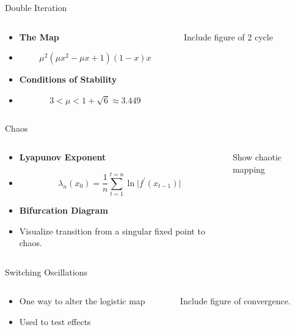 \documentclass{beamer}
\begin{document}
\begin{frame}{Double Iteration}
	\begin{columns}
		\begin{column}{0.5\textwidth}
			\begin{itemize}
				\item
					\textbf{The Map}
				\item
					\begin{equation*}
						\mu^2(\mu x^2-\mu x+1)(1-x)x
					\end{equation*}
				\pause
				\item
					\textbf{Conditions of Stability}
				\item
					\begin{equation*}
						3<\mu<1+\sqrt{6}\approx3.449
					\end{equation*}
			\end{itemize}
		\end{column}
		\begin{column}{0.5\textwidth}
			Include figure of 2 cycle
		\end{column}
	\end{columns}
\end{frame}

\begin{frame}{Chaos}
	\begin{columns}
		\begin{column}{0.5\textwidth}
			\begin{itemize}
				\item
					\textbf{Lyapunov Exponent}
				\item
					\begin{equation*}
						\lambda_n(x_0)=\frac{1}{n}\sum\limits_{t=1}^{t=n}\ln\lvert f^\prime(x_{t-1})\rvert
					\end{equation*}
				\pause
				\item
					\textbf{Bifurcation Diagram}
				\item
					Visualize transition from a singular fixed point to chaos.
			\end{itemize}
		\end{column}
		\pause
		\begin{column}{0.5\textwidth}
			Show chaotic mapping
		\end{column}
	\end{columns}
\end{frame}

\begin{frame}{Switching Oscillations}
	\begin{columns}
		\begin{column}{0.5\textwidth}
			\begin{itemize}
				\item
					One way to alter the logistic map
				\item
					Used to test effects
			\end{itemize}
		\end{column}
		\begin{column}{0.5\textwidth}
			Include figure of convergence.
		\end{column}
	\end{columns}
\end{frame}
\end{document}
